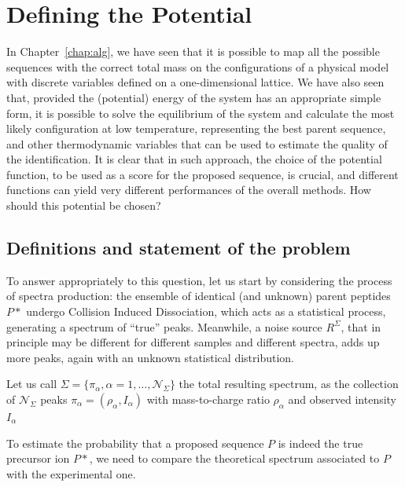 \chapter{Defining the Potential}
\label{chap:pot}
\nopagebreak



In Chapter~\ref{chap:alg}, we have seen that it is possible to map all the
possible sequences with the correct total mass on the configurations of a
physical model with discrete variables defined on a one-dimensional lattice. We
have also seen that, provided the (potential) energy of the system has an
appropriate simple form, it is possible to solve the equilibrium of the system
and calculate the most likely configuration at low temperature, representing the
best parent sequence, and other thermodynamic variables that can be used to
estimate the quality of the identification.
It is clear that in such approach, the choice of the potential function, to be
used as a score for the proposed sequence, is crucial, and different functions
can yield very different performances of the overall methods. How should this
potential be chosen?


\section{Definitions and statement of the problem}

To answer appropriately to this question, let us start by considering the
process of spectra production: the ensemble of identical (and unknown) parent
peptides $P*$ undergo Collision Induced Dissociation, which acts as a
statistical process, generating a spectrum of ``true'' peaks. Meanwhile, a noise
source $R^\Sigma$, that in principle may be different for different samples and
different spectra, adds up more peaks, again with an unknown statistical
distribution.

Let us call  $\Sigma=\{\pi_\alpha,\alpha=1,\dots,\mathcal N_\Sigma\}$  the total
resulting spectrum, as the collection of $\mathcal N_\Sigma$ peaks
$\pi_\alpha=(\rho_\alpha,I_\alpha)$  with mass-to-charge ratio $\rho_\alpha$ and
observed intensity $I_\alpha$

To estimate the probability that a proposed sequence $P$ is indeed the true
precursor ion $P*$, we need to compare the theoretical spectrum associated to
$P$ with the experimental one.





